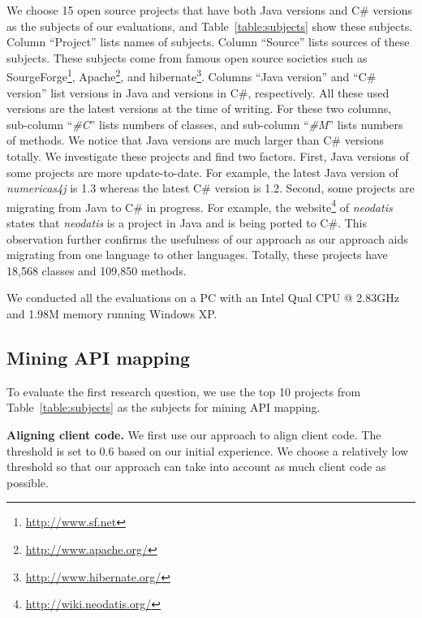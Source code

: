 We choose 15 open source projects that have both Java versions and
C\# versions as the subjects of our evaluations, and
Table~\ref{table:subjects} show these subjects. Column ``Project''
lists names of subjects. Column ``Source'' lists sources of these
subjects. These subjects come from famous open source societies such
as SourgeForge\footnote{\url{http://www.sf.net}},
Apache\footnote{\url{http://www.apache.org/}}, and
hibernate\footnote{\url{http://www.hibernate.org/}}. Columns ``Java
version'' and ``C\# version'' list versions in Java and versions in
C\#, respectively. All these used versions are the latest versions
at the time of writing. For these two columns, sub-column
``\emph{\#C}'' lists numbers of classes, and sub-column
``\emph{\#M}'' lists numbers of methods. We notice that Java
versions are much larger than C\# versions totally. We investigate
these projects and find two factors. First, Java versions of some
projects are more update-to-date. For example, the latest Java
version of \emph{numericas4j} is 1.3 whereas the latest C\# version
is 1.2. Second, some projects are migrating from Java to C\# in
progress. For example, the
website\footnote{\url{http://wiki.neodatis.org/}} of \emph{neodatis}
states that \emph{neodatis} is a project in Java and is being ported
to C\#. This observation further confirms the usefulness of our
approach as our approach aids migrating from one language to other
languages. Totally, these projects have 18,568 classes and 109,850
methods.

We conducted all the evaluations on a PC with an Intel Qual CPU @
2.83GHz and 1.98M memory running Windows XP.
\subsection{Mining API mapping}
\label{sec:evaluation:mining}

To evaluate the first research question, we use the top 10 projects
from Table~\ref{table:subjects} as the subjects for mining API
mapping.


\textbf{Aligning client code.} We first use our approach to align
client code. The threshold is set to 0.6 based on our initial
experience. We choose a relatively low threshold so that our
approach can take into account as much client code as possible.

